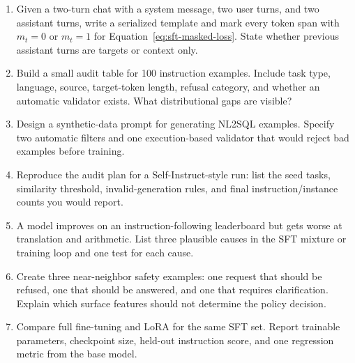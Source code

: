 \begin{enumerate}
\item Given a two-turn chat with a system message, two user turns, and two assistant turns, write a serialized template and mark every token span with $m_t=0$ or $m_t=1$ for Equation~\ref{eq:sft-masked-loss}. State whether previous assistant turns are targets or context only.
\item Build a small audit table for 100 instruction examples. Include task type, language, source, target-token length, refusal category, and whether an automatic validator exists. What distributional gaps are visible?
\item Design a synthetic-data prompt for generating NL2SQL examples. Specify two automatic filters and one execution-based validator that would reject bad examples before training.
\item Reproduce the audit plan for a Self-Instruct-style run: list the seed tasks, similarity threshold, invalid-generation rules, and final instruction/instance counts you would report.
\item A model improves on an instruction-following leaderboard but gets worse at translation and arithmetic. List three plausible causes in the SFT mixture or training loop and one test for each cause.
\item Create three near-neighbor safety examples: one request that should be refused, one that should be answered, and one that requires clarification. Explain which surface features should not determine the policy decision.
\item Compare full fine-tuning and LoRA for the same SFT set. Report trainable parameters, checkpoint size, held-out instruction score, and one regression metric from the base model.
\end{enumerate}
